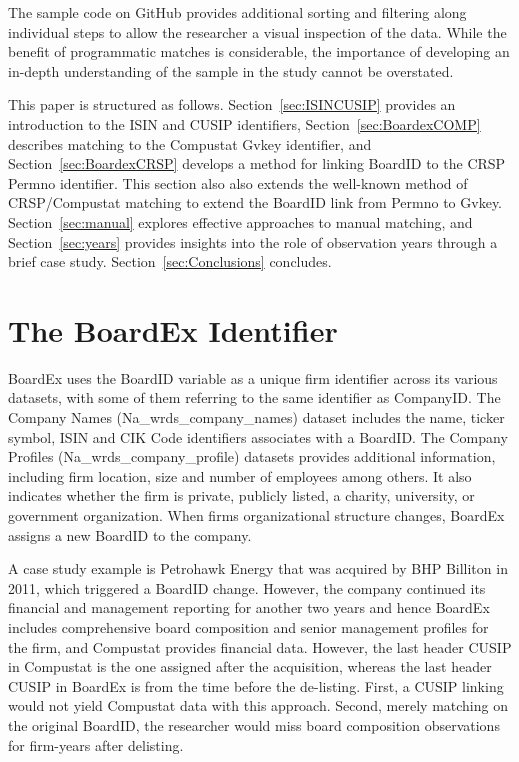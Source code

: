 \documentclass[12pt]{article}
\begin{document}
The sample code on GitHub provides additional sorting and filtering along individual steps to allow the researcher a visual inspection of the data.
While the benefit of programmatic matches is considerable, the importance of developing an in-depth understanding of the sample in the study cannot be overstated.

This paper is structured as follows.
Section~\ref{sec:ISINCUSIP} provides an introduction to the ISIN and CUSIP identifiers, Section~\ref{sec:BoardexCOMP} describes matching to the Compustat Gvkey identifier, and Section~\ref{sec:BoardexCRSP} develops a method for linking BoardID to the CRSP Permno identifier.
This section also also extends the well-known method of CRSP/Compustat matching to extend the BoardID link from Permno to Gvkey.
Section~\ref{sec:manual} explores effective approaches to manual matching, and Section~\ref{sec:years} provides insights into the role of observation years through a brief case study.
Section~\ref{sec:Conclusions} concludes.

\section{The BoardEx Identifier}\label{sec:BoardID}

BoardEx uses the BoardID variable as a unique firm identifier across its various datasets, with some of them referring to the same identifier as CompanyID.
The Company Names (Na\_wrds\_company\_names) dataset includes the name, ticker symbol, ISIN and CIK Code identifiers associates with a BoardID.
The Company Profiles (Na\_wrds\_company\_profile) datasets provides additional information, including firm location, size and number of employees among others.
It also indicates whether the firm is private, publicly listed, a charity, university, or government organization.
When firms organizational structure changes, BoardEx assigns a new BoardID to the company.

A case study example is Petrohawk Energy that was acquired by BHP Billiton in 2011, which triggered a BoardID change.
However, the company continued its financial and management reporting for another two years and hence BoardEx includes comprehensive board composition and senior management profiles for the firm, and Compustat provides financial data.
However, the last header CUSIP in Compustat is the one assigned after the acquisition, whereas the last header CUSIP in BoardEx is from the time before the de-listing.
First, a CUSIP linking would not yield Compustat data with this approach.
Second, merely matching on the original BoardID, the researcher would miss board composition observations for firm-years after delisting.
\end{document}
